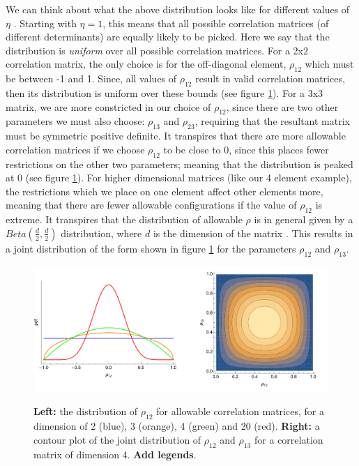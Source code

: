 \documentclass[11pt,fullpage]{book}
\begin{document}
We can think about what the above distribution looks like for different values of $\eta$ \cite{stan-manual:2015}. Starting with $\eta=1$, this means that all possible correlation matrices (of different determinants) are equally likely to be picked. Here we say that the distribution is \textit{uniform} over all possible correlation matrices. For a 2x2 correlation matrix, the only choice is for the off-diagonal element, $\rho_{12}$ which must be between -1 and 1. Since, all values of $\rho_{12}$ result in valid correlation matrices, then its distribution is uniform over these bounds (see figure \ref{fig:Distributions_LKJ_correlations}). For a 3x3 matrix, we are more constricted in our choice of $\rho_{12}$, since there are two other parameters we must also choose: $\rho_{13}$ and $\rho_{23}$, requiring that the resultant matrix must be symmetric positive definite. It transpires that there are more allowable correlation matrices if we choose $\rho_{12}$ to be close to 0, since this places fewer restrictions on the other two parameters; meaning that the distribution is peaked at 0 (see figure \ref{fig:Distributions_LKJ_correlations}). For higher dimensional matrices (like our 4 element example), the restrictions which we place on one element affect other elements more, meaning that there are fewer allowable configurations if the value of $\rho_{12}$ is extreme. It transpires that the distribution of allowable $\rho$ is in general given by a $Beta\left(\frac{d}{2},\frac{d}{2}\right)$ distribution, where $d$ is the dimension of the matrix \cite{lewandowski2009generating}. This results in a joint distribution of the form shown in figure \ref{fig:Distributions_LKJ_correlations} for the parameters $\rho_{12}$ and $\rho_{13}$. 

\begin{figure}
\centering
\scalebox{0.5} 
{\includegraphics{Distributions_LKJ_correlations.pdf}}
\caption{\textbf{Left:} the distribution of $\rho_{12}$ for allowable correlation matrices, for a dimension of 2 (blue), 3 (orange), 4 (green) and 20 (red). \textbf{Right:} a contour plot of the joint distribution of $\rho_{12}$ and $\rho_{13}$ for a correlation matrix of dimension 4. \textbf{Add legends}.}\label{fig:Distributions_LKJ_correlations}
\end{figure}
\end{document}
